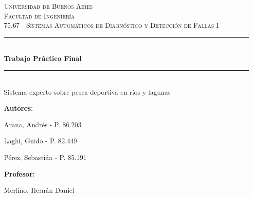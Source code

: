 \documentclass[a4paper,11pt]{article}
\begin{document}

\thispagestyle{empty}

\begin{titlepage}

  \newcommand{\HRule}{\rule{\linewidth}{0.5mm}}
  \newenvironment{bottompar}{\par\vspace*{\fill}}{\clearpage}

  \center

  \textsc{\LARGE Universidad de Buenos Aires}\\[1.0cm]
  \textsc{\Large Facultad de Ingeniería}\\[1.5cm]


  \textsc{\large 75.67 - Sistemas Automáticos de Diagnóstico y Detección de Fallas I}\\[0.25cm]
  \HRule\\[0.25cm]
  {\huge \bfseries Trabajo Práctico Final}\\
  \HRule\\
  Sistema experto sobre pesca deportiva en ríos y lagunas

  \begin{bottompar}
    \begin{minipage}[t]{.45\linewidth}
      \begin{flushleft}
        {\bfseries Autores:}

        Arana, Andrés          - P. 86.203

        Laghi, Guido           - P. 82.449

        Pérez, Sebastián       - P. 85.191
      \end{flushleft}
    \end{minipage}
    \hfill
    \begin{minipage}[t]{.45\linewidth}
      \begin{flushright}
        {\bfseries Profesor:}

        Merlino, Hernán Daniel
      \end{flushright}
    \end{minipage}
  \end{bottompar}

\end{titlepage}

\end{document}
